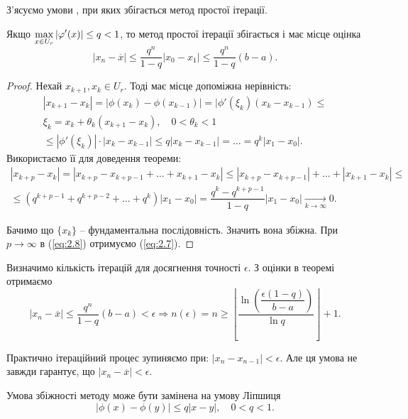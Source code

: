 З'ясуємо умови , при яких збігається метод простої ітерації.

\begin{theorem}
	Якщо $\displaystyle\max\limits_{x \in U_r} |\varphi'(x)| \le q < 1$, то метод простої ітерації збігається і має місце оцінка 
	\begin{equation}
		\label{eq:2.7}
		|x_n - \overline{x}| \le \dfrac{q^n}{1-q}|x_0-x_1| \le \dfrac{q^n}{1-q}(b-a).
	\end{equation}
\end{theorem}

\begin{proof}
	Нехай $x_{k+1}, x_k \in U_r$. Тоді має місце допоміжна нерівність:
	\begin{multline*}
		|x_{k+1} - x_k| = |\phi(x_k) - \phi(x_{k-1})| = |\phi'(\xi_k)(x_k - x_{k-1}) \le \\
		\xi_k = x_k + \theta_k (x_{k+1} - x_k), \quad 0 < \theta_k < 1 \\
		\le |\phi'(\xi_k)| \cdot |x_k - x_{k-1}| \le q |x_k - x_{k-1}| = \ldots = q^k |x_1 - x_0|.
	\end{multline*}
	Використаємо її для доведення теореми:
	\begin{multline}
		\label{eq:2.8}
		|x_{k+p} - x_k| = |x_{k+p} - x_{k+p-1} + \ldots + x_{k+1} - x_k| \le |x_{k+p} - x_{k+p-1}| + \ldots + |x_{k+1} - x_k| \le \\
		\le (q^{k+p-1}+q^{k+p-2}+\ldots+q^k) |x_1 - x_0| = \dfrac{q^k - q^{k+p-1}}{1-q}|x_1-x_0| \xrightarrow[k\to\infty]{}0.
	\end{multline}

	Бачимо що $\{x_k\}$ -- фундаментальна послідовність. Значить вона збіжна. При $p\to\infty$ в (\ref{eq:2.8}) отримуємо (\ref{eq:2.7}).
\end{proof}

Визначимо кількість ітерацій для досягнення точності $\epsilon$. З оцінки в теоремі отримаємо \[ |x_n - \overline{x}| \le \dfrac{q^n}{1-q}(b-a) < \epsilon \Rightarrow n(\epsilon) = n \ge \left\lfloor \dfrac{\ln \left(\dfrac{\epsilon (1-q)}{b - a}\right)}{\ln q} \right\rfloor + 1. \]

Практично ітераційний процес зупиняємо при: $|x_n - x_{n-1}| < \epsilon$. Але ця умова не завжди гарантує, що $|x_n - \overline{x}| < \epsilon$.

\begin{remark*}
	Умова збіжності методу може бути замінена на умову Ліпшиця \[|\phi(x) -\phi(y)| \le q | x - y |,\quad 0 < q < 1.\]
\end{remark*}

